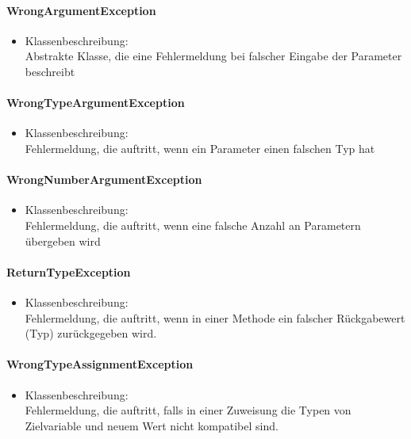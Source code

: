 \documentclass[parskip=full]{scrartcl}
\begin{document}
\paragraph{WrongArgumentException}
\begin{itemize}
\item Klassenbeschreibung: \\
Abstrakte Klasse, die eine Fehlermeldung bei falscher Eingabe der Parameter beschreibt
\end{itemize}

\paragraph{WrongTypeArgumentException}
\begin{itemize}
\item Klassenbeschreibung: \\
Fehlermeldung, die auftritt, wenn ein Parameter einen falschen Typ hat
\end{itemize}

\paragraph{WrongNumberArgumentException}
\begin{itemize}
\item Klassenbeschreibung: \\
Fehlermeldung, die auftritt, wenn eine falsche Anzahl an Parametern übergeben wird
\end{itemize}

\paragraph{ReturnTypeException}
\begin{itemize}
\item Klassenbeschreibung: \\
Fehlermeldung, die auftritt, wenn in einer Methode ein falscher Rückgabewert (Typ) zurückgegeben wird.
\end{itemize}

\paragraph{WrongTypeAssignmentException}
\begin{itemize}
\item Klassenbeschreibung: \\
Fehlermeldung, die auftritt, falls in einer Zuweisung die Typen von Zielvariable und neuem Wert nicht kompatibel sind.
\end{itemize}
\end{document}
